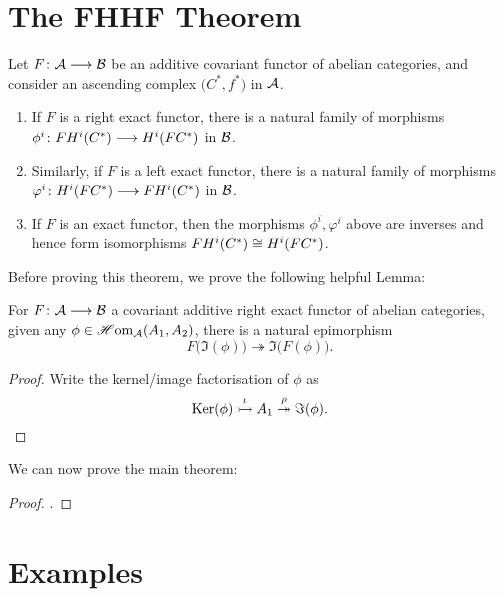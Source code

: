 \documentclass[a4paper]{article}
\def\mono{\rightarrowtail}
\def\epi{\twoheadrightarrow}
\begin{document}
\section{The FHHF Theorem}
\begin{Theorem}
    Let $F\colon\mathcal{A}\longrightarrow \mathcal{B}$ be an additive covariant functor of abelian categories, and consider an ascending complex $\big(C^{*}, f^*\big)$ in $\mathcal{A}$.
    \begin{enumerate}
        \item If $F$ is a right exact functor, there is a natural family of morphisms $\phi^i\colon FH^{i}(C^{*})\longrightarrow H^{i}(FC^{*})$ in $\mathcal{B}$.
        \item Similarly, if $F$ is a left exact functor, there is a natural family of morphisms $\varphi^i\colon H^{i}(FC^{*})\longrightarrow FH^{i}(C^{*})$ in $\mathcal{B}$. 
        \item If $F$ is an exact functor, then the morphisms $\phi^i, \varphi^i$ above are inverses and hence form isomorphisms ${FH^{i}(C^{*})} \cong {H^{i}(FC^{*})}$.
    \end{enumerate}
\end{Theorem}
Before proving this theorem, we prove the following helpful Lemma:
\begin{Lemma}
    For $F\colon\mathcal{A}\longrightarrow \mathcal{B}$ a covariant additive right exact functor of abelian categories, given any $\phi \in \operatorname{\mathscr{H}om}_{\mathcal{A}}(A_1,A_2)$, there is a natural epimorphism %
    \[
        F\big(\Im(\phi)\big) \epi \Im\big(F(\phi)\big).
    \]
\end{Lemma}
\begin{proof}
    Write the kernel/image factorisation of $\phi$ as
    \[
        \Ker(\phi) \stackrel{\iota}{\mono} A_1 \stackrel{\rho}{\epi} \Im(\phi).
    \]

\end{proof}
We can now prove the main theorem:
\begin{proof}
    .
\end{proof}
\section{Examples}
\end{document}
